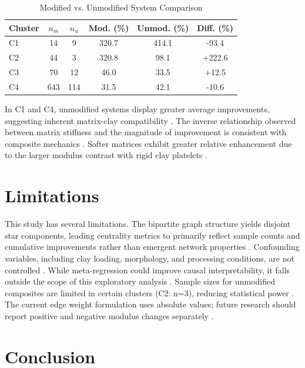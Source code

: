 \documentclass[conference]{IEEEtran}
\begin{document}
\begin{table}[htbp]
\caption{Modified vs. Unmodified System Comparison}
\begin{center}
\footnotesize
\begin{tabular}{@{}lccccc@{}}
\toprule
Cluster & $n_m$ & $n_u$ & Mod. (\%) & Unmod. (\%) & Diff. (\%) \\
\midrule
C1 & 14 & 9 & 320.7 & 414.1 & -93.4 \\
C2 & 44 & 3 & 320.8 & 98.1 & +222.6 \\
C3 & 70 & 12 & 46.0 & 33.5 & +12.5 \\
C4 & 643 & 114 & 31.5 & 42.1 & -10.6 \\
\bottomrule
\end{tabular}
\label{tab:modification}
\end{center}
\end{table}

In C1 and C4, unmodified systems display greater average improvements, suggesting inherent matrix-clay compatibility \cite{19, 65, 132, 146}. The inverse relationship observed between matrix stiffness and the magnitude of improvement is consistent with composite mechanics \cite{10, 25, 112}. Softer matrices exhibit greater relative enhancement due to the larger modulus contrast with rigid clay platelets \cite{8, 11, 14, 22}.

\section{Limitations}

This study has several limitations. The bipartite graph structure yields disjoint star components, leading centrality metrics to primarily reflect sample counts and cumulative improvements rather than emergent network properties \cite{8, 11}. Confounding variables, including clay loading, morphology, and processing conditions, are not controlled \cite{10, 22, 92}. While meta-regression could improve causal interpretability, it falls outside the scope of this exploratory analysis \cite{68, 112, 127}. Sample sizes for unmodified composites are limited in certain clusters (C2: n=3), reducing statistical power \cite{91, 140}. The current edge weight formulation uses absolute values; future research should report positive and negative modulus changes separately \cite{14, 25}.

\section{Conclusion}
\end{document}
